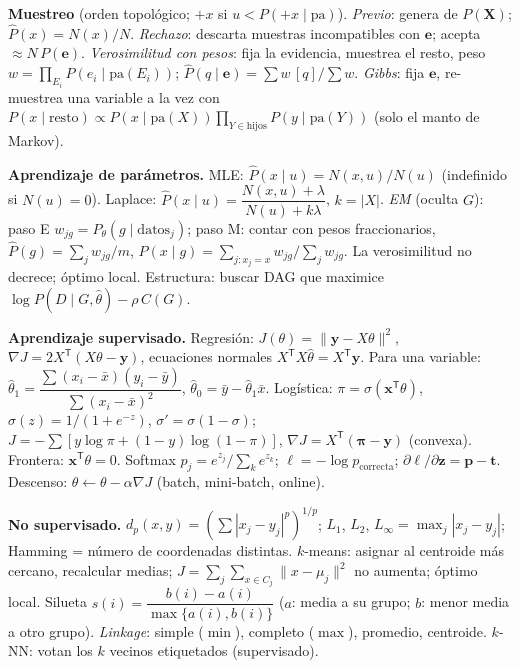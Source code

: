 \begin{formulario}
\textbf{Muestreo} (orden topológico; $+x$ si $u<P(+x\mid\mathrm{pa})$).
\emph{Previo}: genera de $P(\mathbf X)$; $\hat P(x)=N(x)/N$.
\emph{Rechazo}: descarta muestras incompatibles con $\mathbf e$; acepta $\approx N\,P(\mathbf e)$.
\emph{Verosimilitud con pesos}: fija la evidencia, muestrea el resto, peso $w=\prod_{E_i}P(e_i\mid\mathrm{pa}(E_i))$;
$\hat P(q\mid\mathbf e)=\sum w\,[q]/\sum w$.
\emph{Gibbs}: fija $\mathbf e$, re-muestrea una variable a la vez con
$P(x\mid\text{resto})\propto P(x\mid\mathrm{pa}(X))\prod_{Y\in\mathrm{hijos}}P(y\mid\mathrm{pa}(Y))$ (solo el manto de Markov).
\end{formulario}

\begin{formulario}
\textbf{Aprendizaje de parámetros.} MLE: $\hat P(x\mid u)=N(x,u)/N(u)$ (indefinido si $N(u)=0$).
Laplace: $\hat P(x\mid u)=\dfrac{N(x,u)+\lambda}{N(u)+k\lambda}$, $k=|X|$.
\emph{EM} (oculta $G$): paso E $w_{jg}=P_\theta(g\mid\text{datos}_j)$; paso M: contar con pesos fraccionarios,
$\hat P(g)=\sum_jw_{jg}/m$, $\hat P(x\mid g)=\sum_{j:x_j=x}w_{jg}/\sum_jw_{jg}$. La verosimilitud no decrece; óptimo local.
Estructura: buscar DAG que maximice $\log P(D\mid G,\hat\theta)-\rho\,C(G)$.
\end{formulario}

\begin{formulario}
\textbf{Aprendizaje supervisado.} Regresión: $J(\theta)=\|\mathbf y-X\theta\|^2$, $\nabla J=2X^\mathsf T(X\theta-\mathbf y)$,
ecuaciones normales $X^\mathsf TX\hat\theta=X^\mathsf T\mathbf y$. Para una variable: $\hat\theta_1=\dfrac{\sum(x_i-\bar x)(y_i-\bar y)}{\sum(x_i-\bar x)^2}$, $\hat\theta_0=\bar y-\hat\theta_1\bar x$.
Logística: $\pi=\sigma(\mathbf x^\mathsf T\theta)$, $\sigma(z)=1/(1+e^{-z})$, $\sigma'=\sigma(1-\sigma)$;
$J=-\sum[y\log\pi+(1-y)\log(1-\pi)]$, $\nabla J=X^\mathsf T(\boldsymbol\pi-\mathbf y)$ (convexa). Frontera: $\mathbf x^\mathsf T\theta=0$.
Softmax $p_j=e^{z_j}/\sum_ke^{z_k}$; $\ell=-\log p_{\text{correcta}}$; $\partial\ell/\partial\mathbf z=\mathbf p-\mathbf t$.
Descenso: $\theta\leftarrow\theta-\alpha\nabla J$ (batch, mini-batch, online).
\end{formulario}

\begin{formulario}
\textbf{No supervisado.} $d_p(x,y)=(\sum|x_j-y_j|^p)^{1/p}$; $L_1$, $L_2$, $L_\infty=\max_j|x_j-y_j|$; Hamming = número de coordenadas distintas.
$k$-means: asignar al centroide más cercano, recalcular medias; $J=\sum_j\sum_{x\in C_j}\|x-\mu_j\|^2$ no aumenta; óptimo local.
Silueta $s(i)=\dfrac{b(i)-a(i)}{\max\{a(i),b(i)\}}$ ($a$: media a su grupo; $b$: menor media a otro grupo).
\emph{Linkage}: simple ($\min$), completo ($\max$), promedio, centroide. $k$-NN: votan los $k$ vecinos etiquetados (supervisado).
\end{formulario}

